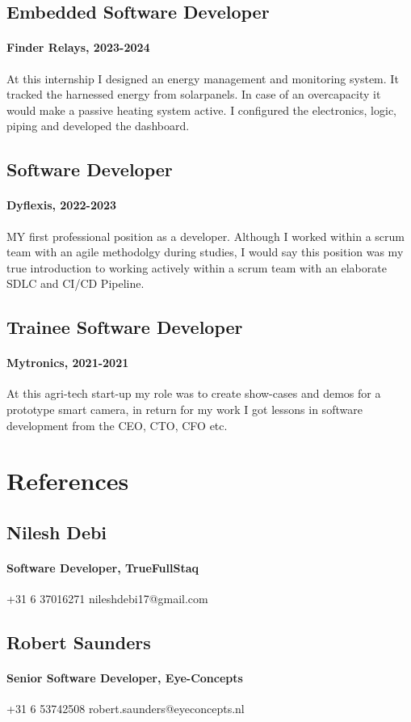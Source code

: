 \documentclass{article}
\begin{document}
\subsection{Embedded Software Developer}
\paragraph{Finder Relays, 2023-2024}
At this internship I designed an energy management and monitoring system. It tracked the harnessed energy from solarpanels. In case of an overcapacity it would make a passive heating system active. I configured the electronics, logic, piping and developed the dashboard.

\subsection{Software Developer}
\paragraph{Dyflexis, 2022-2023}
MY first professional position as a developer. Although I worked within a scrum team with an agile methodolgy during studies, I would say this position was my true introduction to working actively within a scrum team with an elaborate SDLC and CI/CD Pipeline.

\subsection{Trainee Software Developer}
\paragraph{Mytronics, 2021-2021}
At this agri-tech start-up my role was to create show-cases and demos for a prototype smart camera, in return for my work I got lessons in software development from the CEO, CTO, CFO etc.

\section{References}
\subsection{Nilesh Debi}
\paragraph{Software Developer, TrueFullStaq}
+31 6 37016271
nileshdebi17@gmail.com

\subsection{Robert Saunders}
\paragraph{Senior Software Developer, Eye-Concepts}
+31 6 53742508
robert.saunders@eyeconcepts.nl
\end{document}
